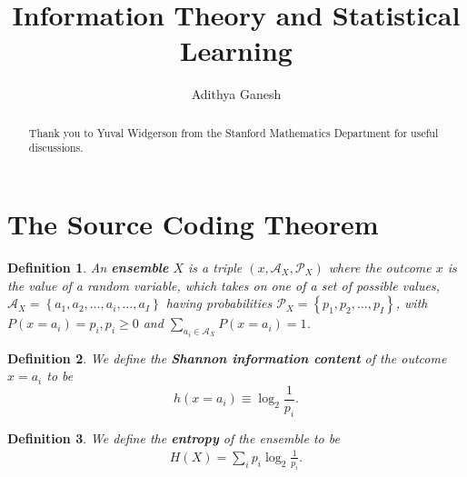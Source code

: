 \documentclass[12pt]{extarticle}
\title{Information Theory and Statistical Learning}
\author{Adithya Ganesh}
\newtheorem*{definition}{Definition}
\newtheorem*{exercise}{Exercise}
\begin{document}
\maketitle

\renewcommand{\abstractname}{Acknowledgments}

\begin{abstract}
  \noindent Thank you to Yuval Widgerson from the Stanford Mathematics Department for useful discussions.
\end{abstract}

\tableofcontents

\section{The Source Coding Theorem}


\medskip


\begin{definition}
  An {\bf ensemble} $X$ is a triple $(x, \mathcal{A}_X, \mathcal{P}_X)$ where the outcome $x$ is the value of a random variable, which takes on one of a set of possible values, $\mathcal{A}_X = \left\{ a_1, a_2, \dots, a_i, \dots, a_I \right\}$ having probabilities $\mathcal{P}_X = \left\{ p_1, p_2, \dots, p_I \right\}$, with $P(x = a_i) = p_i, p_i \geq 0$ and $\sum_{a_i \in \mathcal{A}_X} P(x = a_i) = 1$.
\end{definition}

\medskip

\begin{definition}
  We define the {\bf Shannon information content} of the outcome $x = a_i$ to be
  \[
    h(x = a_i) \equiv \log_2 \frac{1}{p_i}.
  \]
\end{definition}

\begin{definition}
  We define the {\bf entropy} of the ensemble to be
  \begin{align*}
    H(X) = \sum_{i} p_i \log_2 \frac{1}{p_i}.
  \end{align*}
\end{definition}
\end{document}
